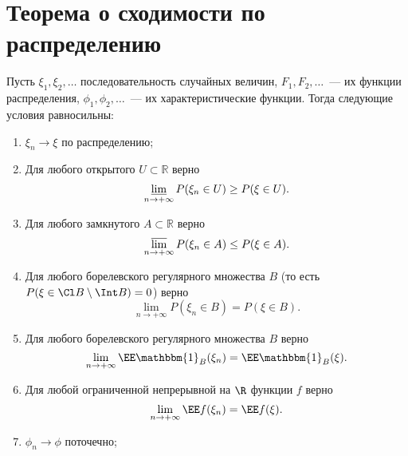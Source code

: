 \section{Теорема о сходимости по распределению}

 \begin{theorem}
    Пусть $\xi_1, \xi_2, \ldots$ последовательность случайных величин, $F_1, F_2, \ldots$~--- их функции распределения, $\phi_1, \phi_2, \ldots$~--- их характеристические функции. Тогда следующие условия равносильны:

     \begin{enumerate}
         \item $\xi_n \rightarrow \xi$ по распределению;

         \item  Для любого открытого $ U \subset\mathbb{R}$ верно $$\varliminf_{n\rightarrow+\infty} P(\xi_n\in U ) \ge P(\xi\in U ).$$

         \item Для любого замкнутого $A\subset\mathbb{R}$ верно
         $$\varlimsup_{n\rightarrow+\infty} P(\xi_n\in A) \le P(\xi\in A).$$

         \item Для любого борелевского регулярного множества $B$ (то есть $P(\xi \in \Cl B \setminus \Int B) = 0$) верно
         $$\lim_{n\rightarrow+\infty}P(\xi_n\in B) = P(\xi \in B).$$

         \item Для любого борелевского регулярного множества $B$ верно
         $$\lim_{n\rightarrow+\infty} \EE \mathbbm{1}_B(\xi_n) = \EE \mathbbm{1}_B(\xi).$$

         \item Для любой ограниченной непрерывной на $\R$ функции $f$ верно
         $$\lim_{n\rightarrow+\infty} \EE f(\xi_n) = \EE f(\xi).$$

         \item $\phi_n\rightarrow \phi$ поточечно;
     \end{enumerate}
 \end{theorem}

